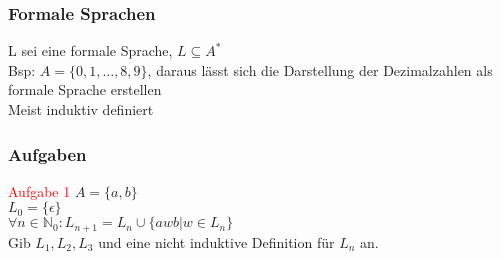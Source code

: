 \documentclass{beamer}
\begin{document}
	\begin{frame}
		\frametitle{Formale Sprachen}
		L sei eine formale Sprache, $L\subseteq A^{\ast}$\\
		Bsp: $A =\{0,1,\dots ,8,9\}$, daraus lässt sich die Darstellung der Dezimalzahlen als formale Sprache erstellen\\
		Meist induktiv definiert\\
	\end{frame}
	\begin{frame}
		\frametitle{Aufgaben}
		\textcolor{red}{Aufgabe 1} $A=\{a,b\}$\\
		$L_{0}=\{\epsilon\}$\\
		$\forall n\in\mathbb{N}_{0}: L_{n+1}=L_{n}\cup \{awb\vert w\in L_{n}\}$\\
		Gib $L_{1}, L_{2}, L_{3}$ und eine nicht induktive Definition für $L_{n}$ an.%
	\end{frame}
\end{document}
